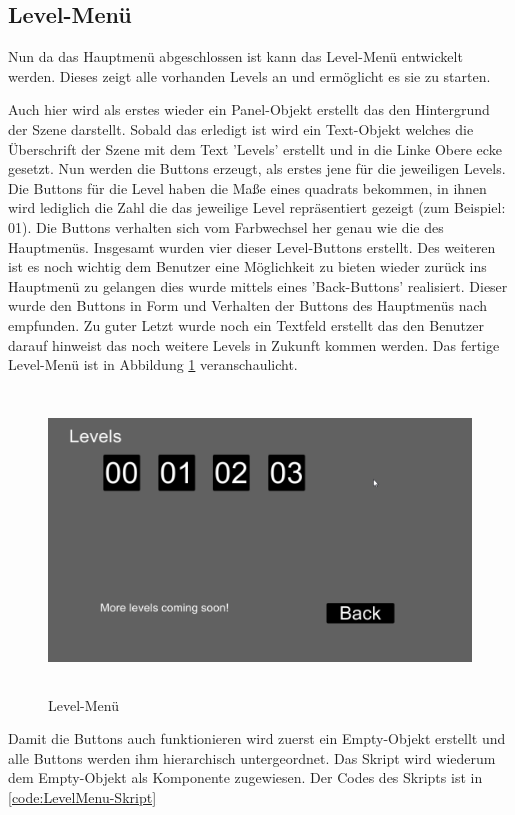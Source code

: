 \subsection{Level-Menü}
Nun da das Hauptmenü abgeschlossen ist kann das Level-Menü entwickelt werden. Dieses zeigt alle vorhanden Levels an und ermöglicht es sie zu starten. 

Auch hier wird als erstes wieder ein Panel-Objekt erstellt das den Hintergrund der Szene darstellt. Sobald das erledigt ist wird ein Text-Objekt welches die Überschrift der Szene mit dem Text 'Levels' erstellt und in die Linke Obere ecke gesetzt. Nun werden die Buttons erzeugt, als erstes jene für die jeweiligen Levels. Die Buttons für die Level haben die Maße eines quadrats bekommen, in ihnen wird lediglich die Zahl die das jeweilige Level repräsentiert gezeigt (zum Beispiel: 01). Die Buttons verhalten sich vom Farbwechsel her genau wie die des Hauptmenüs. Insgesamt wurden vier dieser Level-Buttons erstellt. Des weiteren ist es noch wichtig dem Benutzer eine Möglichkeit zu bieten wieder zurück ins Hauptmenü zu gelangen dies wurde mittels eines 'Back-Buttons' realisiert. Dieser wurde den Buttons in Form und Verhalten der Buttons des Hauptmenüs nach empfunden. Zu guter Letzt wurde noch ein Textfeld erstellt das den Benutzer darauf hinweist das noch weitere Levels in Zukunft kommen werden. Das fertige Level-Menü ist in Abbildung \ref{Levelmenu} veranschaulicht.

\begin{figure}[H]
	\includegraphics[height=8cm]{images/Levelmenu.png}
	\caption{Level-Menü}
	\label{Levelmenu}
\end{figure}

Damit die Buttons auch funktionieren wird zuerst ein Empty-Objekt erstellt und alle Buttons werden ihm hierarchisch untergeordnet. Das Skript wird wiederum dem Empty-Objekt als Komponente zugewiesen. Der Codes des Skripts ist in \cref{code:LevelMenu-Skript}

